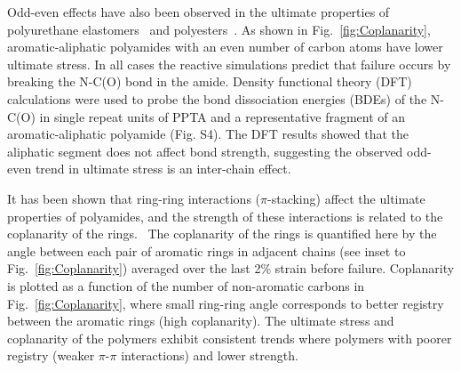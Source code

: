 \documentclass[journal=langd5,manuscript=article]{achemso}
\begin{document}
Odd-even effects have also been observed in the ultimate properties of polyurethane
elastomers~\cite{prisacariu2011influence} and polyesters~\cite{shen2017facile}.
As shown in Fig.~\ref{fig:Coplanarity}, aromatic-aliphatic polyamides with an even number of carbon atoms have lower ultimate stress.
In all cases the reactive simulations predict that failure occurs by breaking the N-C(O) bond in the amide.
Density functional theory (DFT) calculations were used to probe the bond dissociation energies (BDEs) of the N-C(O) in single repeat units of PPTA and a representative fragment of an aromatic-aliphatic polyamide (Fig. S4).  
The DFT results showed that the aliphatic segment does not affect bond strength, suggesting the observed odd-even trend in ultimate stress is an inter-chain effect.


It has been shown that ring-ring interactions ($\pi$-stacking) affect the ultimate properties of polyamides, and the strength of these interactions is related to the coplanarity of the rings.~\cite{yang2021molecular,burattini2011supramolecular}
The coplanarity of the rings is quantified here by the angle between each pair of aromatic rings in adjacent chains (see inset to Fig.~\ref{fig:Coplanarity}) averaged over the last 2\% strain before failure. 
Coplanarity is plotted as a function of the number of non-aromatic carbons in Fig.~\ref{fig:Coplanarity}, where small ring-ring angle corresponds to better registry between the aromatic rings (high coplanarity).
The ultimate stress and coplanarity of the polymers exhibit consistent trends where polymers with poorer registry (weaker $\pi$-$\pi$ interactions) and lower strength.
\end{document}
